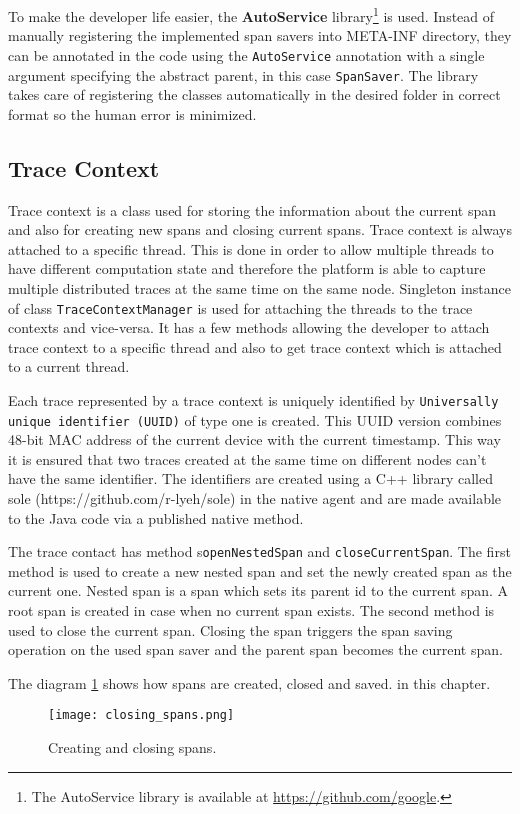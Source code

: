 To make the developer life easier, the \textbf{AutoService} library\footnote{The AutoService library is available at \url{https://github.com/google}.} is used. Instead of manually registering the implemented span savers into META-INF directory, they can be annotated in the code using the \texttt{AutoService} annotation with a single argument specifying the abstract parent, in this case \texttt{SpanSaver}. The library takes care of registering the classes automatically in the desired folder in correct format so the human error is minimized.

\subsection{Trace Context}
Trace context is a class used for storing the information about the current span and also for creating new spans and closing current spans. Trace context is always attached to a specific thread. This is done in order to allow multiple threads to have different computation state and therefore the platform is able to capture multiple distributed traces at the same time on the same node. Singleton instance of class \texttt{TraceContextManager} is used for attaching the threads to the trace contexts and vice-versa. It has a few methods allowing the developer to attach trace context to a specific thread and also to get trace context which is attached to a current thread.

Each trace represented by a trace context is uniquely identified by \texttt{Universally unique identifier (UUID)} of type one is created. This UUID version combines 48-bit MAC address of the current device with the current timestamp. This way it is ensured that two traces created at the same time on different nodes can't have the same identifier. The identifiers are created using a C++ library called sole (https://github.com/r-lyeh/sole) in the native agent and are made available to the Java code via a published native method.

The trace contact has method s\texttt{openNestedSpan} and \texttt{closeCurrentSpan}. The first method is used to create a new nested span and set the newly created span as the current one. Nested span is a span which sets its parent id to the current span. A root span is created in case when no current span exists. The second method is used to close the current span. Closing the span triggers the span saving operation on the used span saver and the parent span becomes the current span.

The diagram \ref{fig:closing_spans} shows how spans are created, closed and saved.  in this chapter. \begin{figure}
	\centering
	\texttt{[image: closing\_spans.png]}
	\caption{Creating and closing spans.}
	\label{fig:closing_spans}
\end{figure}

